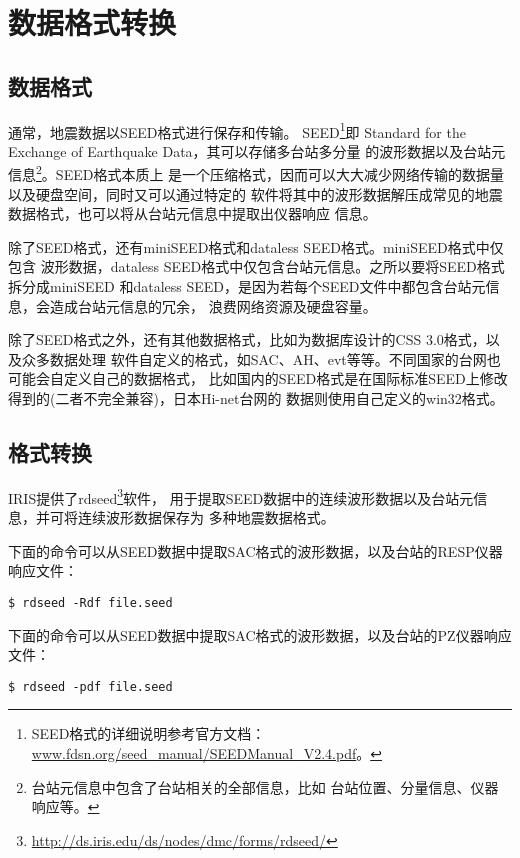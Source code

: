 \section{数据格式转换}
\subsection{数据格式}
通常，地震数据以SEED格式进行保存和传输。
SEED\footnote{SEED格式的详细说明参考官方文档：\url{www.fdsn.org/seed_manual/SEEDManual_V2.4.pdf}。}即
Standard for the Exchange of Earthquake Data，其可以存储多台站多分量
的波形数据以及台站元信息\footnote{台站元信息中包含了台站相关的全部信息，比如
台站位置、分量信息、仪器响应等。}。SEED格式本质上
是一个压缩格式，因而可以大大减少网络传输的数据量以及硬盘空间，同时又可以通过特定的
软件将其中的波形数据解压成常见的地震数据格式，也可以将从台站元信息中提取出仪器响应
信息。

除了SEED格式，还有miniSEED格式和dataless SEED格式。miniSEED格式中仅包含
波形数据，dataless SEED格式中仅包含台站元信息。之所以要将SEED格式拆分成miniSEED
和dataless SEED，是因为若每个SEED文件中都包含台站元信息，会造成台站元信息的冗余，
浪费网络资源及硬盘容量。

除了SEED格式之外，还有其他数据格式，比如为数据库设计的CSS 3.0格式，以及众多数据处理
软件自定义的格式，如SAC、AH、evt等等。不同国家的台网也可能会自定义自己的数据格式，
比如国内的SEED格式是在国际标准SEED上修改得到的(二者不完全兼容)，日本Hi-net台网的
数据则使用自己定义的win32格式。

\subsection{格式转换}
IRIS提供了rdseed\footnote{\url{http://ds.iris.edu/ds/nodes/dmc/forms/rdseed/}}软件，
用于提取SEED数据中的连续波形数据以及台站元信息，并可将连续波形数据保存为
多种地震数据格式。

下面的命令可以从SEED数据中提取SAC格式的波形数据，以及台站的RESP仪器响应文件：
\begin{verbatim}
$ rdseed -Rdf file.seed
\end{verbatim}

下面的命令可以从SEED数据中提取SAC格式的波形数据，以及台站的PZ仪器响应文件：
\begin{verbatim}
$ rdseed -pdf file.seed
\end{verbatim}
